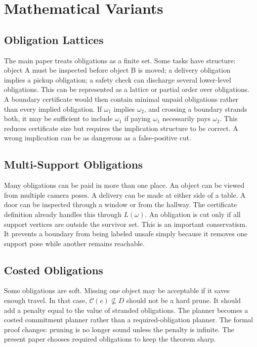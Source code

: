 \documentclass{article}
\newcommand{\cert}{\mathcal{C}}
\begin{document}
\section{Mathematical Variants}

\subsection{Obligation Lattices}

The main paper treats obligations as a finite set. Some tasks have structure: object A must be inspected before object B is moved; a delivery obligation implies a pickup obligation; a safety check can discharge several lower-level obligations. This can be represented as a lattice or partial order over obligations. A boundary certificate would then contain minimal unpaid obligations rather than every implied obligation. If $\omega_1$ implies $\omega_2$, and crossing a boundary strands both, it may be sufficient to include $\omega_1$ if paying $\omega_1$ necessarily pays $\omega_2$. This reduces certificate size but requires the implication structure to be correct. A wrong implication can be as dangerous as a false-positive cut.

\subsection{Multi-Support Obligations}

Many obligations can be paid in more than one place. An object can be viewed from multiple camera poses. A delivery can be made at either side of a table. A door can be inspected through a window or from the hallway. The certificate definition already handles this through $L(\omega)$. An obligation is cut only if all support vertices are outside the survivor set. This is an important conservatism. It prevents a boundary from being labeled unsafe simply because it removes one support pose while another remains reachable.

\subsection{Costed Obligations}

Some obligations are soft. Missing one object may be acceptable if it saves enough travel. In that case, $\cert(e)\nsubseteq D$ should not be a hard prune. It should add a penalty equal to the value of stranded obligations. The planner becomes a costed commitment planner rather than a required-obligation planner. The formal proof changes: pruning is no longer sound unless the penalty is infinite. The present paper chooses required obligations to keep the theorem sharp.
\end{document}
